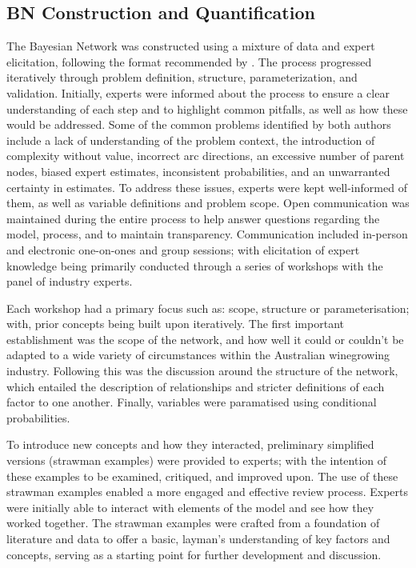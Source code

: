\subsection{BN Construction and Quantification}

The Bayesian Network was constructed using a mixture of data and expert elicitation, following the format recommended by \textcite{korbBayesianArtificialIntelligence2011,pitchforthProposedValidationFramework2013}. The process progressed iteratively through problem definition, structure, parameterization, and validation. Initially, experts were informed about the process to ensure a clear understanding of each step and to highlight common pitfalls, as well as how these would be addressed. Some of the common problems identified by both authors include a lack of understanding of the problem context, the introduction of complexity without value, incorrect arc directions, an excessive number of parent nodes, biased expert estimates, inconsistent probabilities, and an unwarranted certainty in estimates. To address these issues, experts were kept well-informed of them, as well as variable definitions and problem scope. Open communication was maintained during the entire process to help answer questions regarding the model, process, and to maintain transparency. Communication included in-person and electronic one-on-ones and group sessions; with elicitation of expert knowledge being primarily conducted through a series of workshops with the panel of industry experts.

Each workshop had a primary focus such as: scope, structure or parameterisation; with, prior concepts being built upon iteratively. The first important establishment was the scope of the network, and how well it could or couldn't be adapted to a wide variety of circumstances within the Australian winegrowing industry. Following this was the discussion around the structure of the network, which entailed the description of relationships and stricter definitions of each factor to one another. Finally, variables were paramatised using conditional probabilities.

To introduce new concepts and how they interacted, preliminary simplified versions (strawman examples) were provided to experts; with the intention of these examples to be examined, critiqued, and improved upon. The use of these strawman examples enabled a more engaged and effective review process. Experts were initially able to interact with elements of the model and see how they worked together. The strawman examples were crafted from a foundation of literature and data to offer a basic, layman's understanding of key factors and concepts, serving as a starting point for further development and discussion. 

